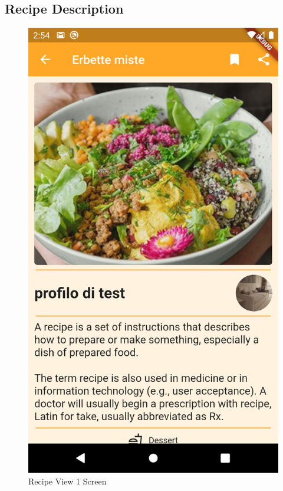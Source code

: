 \subsection{Recipe Description}
\begin{figure}[H]
	\begin{minipage}{0.48\textwidth}
		\centering
		\includegraphics[width = .7\linewidth]{img/RecipeView.png}
		\caption{Recipe View 1 Screen}
	\end{minipage}\hfill
	\begin{minipage}{0.48\textwidth}
		\centering

\end{minipage}
\end{figure}
